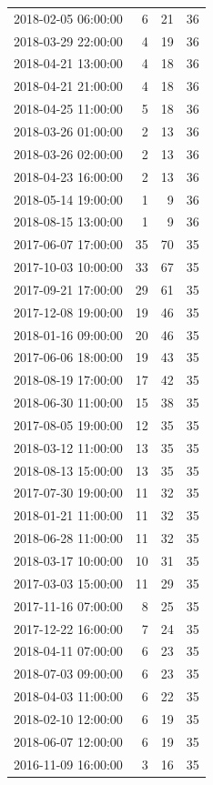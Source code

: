\begin{tabular}{lrrr}
2018-02-05 06:00:00 & 6 & 21 & 36 \\
2018-03-29 22:00:00 & 4 & 19 & 36 \\
2018-04-21 13:00:00 & 4 & 18 & 36 \\
2018-04-21 21:00:00 & 4 & 18 & 36 \\
2018-04-25 11:00:00 & 5 & 18 & 36 \\
2018-03-26 01:00:00 & 2 & 13 & 36 \\
2018-03-26 02:00:00 & 2 & 13 & 36 \\
2018-04-23 16:00:00 & 2 & 13 & 36 \\
2018-05-14 19:00:00 & 1 & 9 & 36 \\
2018-08-15 13:00:00 & 1 & 9 & 36 \\
2017-06-07 17:00:00 & 35 & 70 & 35 \\
2017-10-03 10:00:00 & 33 & 67 & 35 \\
2017-09-21 17:00:00 & 29 & 61 & 35 \\
2017-12-08 19:00:00 & 19 & 46 & 35 \\
2018-01-16 09:00:00 & 20 & 46 & 35 \\
2017-06-06 18:00:00 & 19 & 43 & 35 \\
2018-08-19 17:00:00 & 17 & 42 & 35 \\
2018-06-30 11:00:00 & 15 & 38 & 35 \\
2017-08-05 19:00:00 & 12 & 35 & 35 \\
2018-03-12 11:00:00 & 13 & 35 & 35 \\
2018-08-13 15:00:00 & 13 & 35 & 35 \\
2017-07-30 19:00:00 & 11 & 32 & 35 \\
2018-01-21 11:00:00 & 11 & 32 & 35 \\
2018-06-28 11:00:00 & 11 & 32 & 35 \\
2018-03-17 10:00:00 & 10 & 31 & 35 \\
2017-03-03 15:00:00 & 11 & 29 & 35 \\
2017-11-16 07:00:00 & 8 & 25 & 35 \\
2017-12-22 16:00:00 & 7 & 24 & 35 \\
2018-04-11 07:00:00 & 6 & 23 & 35 \\
2018-07-03 09:00:00 & 6 & 23 & 35 \\
2018-04-03 11:00:00 & 6 & 22 & 35 \\
2018-02-10 12:00:00 & 6 & 19 & 35 \\
2018-06-07 12:00:00 & 6 & 19 & 35 \\
2016-11-09 16:00:00 & 3 & 16 & 35 \\

\end{tabular}
